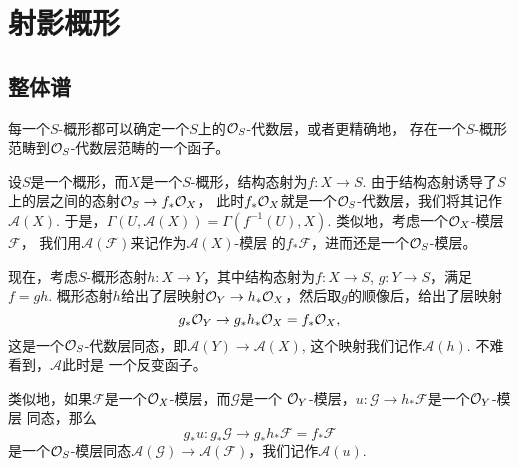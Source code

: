 \chapter{射影概形}

\section{整体谱}

每一个$S$-概形都可以确定一个$S$上的$\mathcal{O}_S$-代数层，或者更精确地，
存在一个$S$-概形范畴到$\mathcal{O}_S$-代数层范畴的一个函子。 

\begin{para}
	设$S$是一个概形，而$X$是一个$S$-概形，结构态射为$f:X\to S$. 
	由于结构态射诱导了$S$上的层之间的态射$\mathcal{O}_S\to f_*\mathcal{O}_X$，
	此时$f_*\mathcal{O}_X$就是一个$\mathcal{O}_S$-代数层，我们将其记作
	$\mathcal A(X)$. 于是，$\Gamma(U,\mathcal A(X))=\Gamma(
	f^{-1}(U),X)$. 类似地，考虑一个$\mathcal{O}_X$-模层$\mathcal F$，
	我们用$\mathcal A(\mathcal F)$来记作为$\mathcal A(X)$-模层
	的$f_*\mathcal F$，进而还是一个$\mathcal{O}_S$-模层。

	现在，考虑$S$-概形态射$h:X\to Y$，其中结构态射为$f:X\to S$, 
	$g:Y\to S$，满足$f=gh$. 概形态射$h$给出了层映射$\mathcal{O}_Y\to
	h_*\mathcal{O}_X$，然后取$g$的顺像后，给出了层映射
	\[
		g_*\mathcal{O}_Y\to g_*h_*\mathcal{O}_X=f_*\mathcal{O}_X,
	\]
	这是一个$\mathcal{O}_S$-代数层同态，即$\mathcal A(Y)\to \mathcal A(X)$,
	这个映射我们记作$\mathcal A(h)$. 不难看到，$\mathcal A$此时是
	一个反变函子。

	类似地，如果$\mathcal F$是一个$\mathcal{O}_X$-模层，而$\mathcal G$是一个
	$\mathcal{O}_Y$-模层，$u:\mathcal G\to h_*\mathcal F$是一个$\mathcal{O}_Y$-模层
	同态，那么
	\[
		g_*u:g_*\mathcal G\to g_*h_*\mathcal F=f_*\mathcal F
	\]
	是一个$\mathcal{O}_S$-模层同态$\mathcal A(\mathcal G)\to \mathcal A
	(\mathcal F)$，我们记作$\mathcal A(u)$. 
\end{para}
